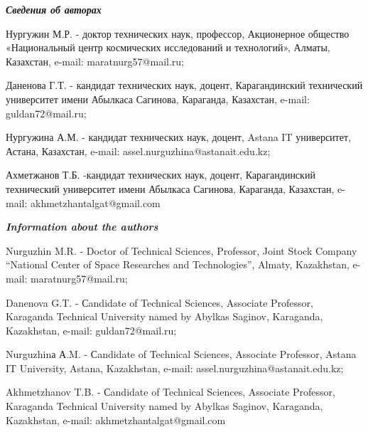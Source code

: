 \emph{{\bfseries Сведения об авторах}}

\begin{noparindent}
Нургужин М.Р. - доктор технических наук, профессор, Акционерное общество
«Национальный центр космических исследований и технологий», Алматы,
Казахстан, e-mail: maratnurg57@mail.ru;

Даненова Г.Т. - кандидат технических наук, доцент, Карагандинский
технический университет имени Абылкаса Сагинова, Караганда, Казахстан,
e-mail: guldan72@mail.ru;

Нургужина А.М. - кандидат технических наук, доцент, Astana IT
университет, Астана, Казахстан, e-mail:
assel.nurguzhina@astanait.edu.kz;

Ахметжанов Т.Б. -кандидат технических наук, доцент, Карагандинский
технический университет имени Абылкаса Сагинова, Караганда, Казахстан,
e-mail: akhmetzhantalgat@gmail.com
\end{noparindent}

\emph{{\bfseries Information about the authors}}

\begin{noparindent}
Nurguzhin M.R. - Doctor of Technical Sciences, Professor, Joint Stock
Company ``National Center of Space Researches and Technologies'',
Almaty, Kazakhstan, e-mail: maratnurg57@mail.ru;

Danenova G.T. - Сandidate of Technical Sciences, Associate Professor,
Karaganda Technical University named by Abylkas Saginov, Karaganda,
Kazakhstan, e-mail: guldan72@mail.ru;

Nurguzhinа А.M. - Сandidate of Technical Sciences, Associate Professor,
Astana IT University, Astana, Kazakhstan, e-mail:
assel.nurguzhina@astanait.edu.kz;

Akhmetzhanov T.B. - Сandidate of Technical Sciences, Associate
Professor, Karaganda Technical University named by Abylkas Saginov,
Karaganda, Kazakhstan, e-mail: akhmetzhantalgat@gmail.com\newpage
\end{noparindent}
